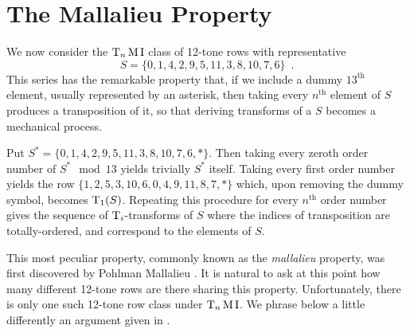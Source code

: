 \section{The Mallalieu Property}
\label{mallalieu-section}

We now consider the $\operatorname{T}_n\operatorname{M}\operatorname{I}$ class of 12-tone rows with representative
\begin{equation}
	S = \{ 0, 1, 4, 2, 9, 5, 11, 3, 8, 10, 7, 6 \} \enspace.
\end{equation}
This series has the remarkable property that, if we include a dummy $13^\text{th}$ element, usually represented by an asterisk, then taking every $n^\text{th}$ element of $S$ produces a transposition of it, so that deriving transforms of a $S$ becomes a mechanical process.

\begin{example}
	Put $S^* = \{ 0, 1, 4, 2, 9, 5, 11, 3, 8, 10, 7, 6, * \}$. Then taking every zeroth order number of $S^* \mod 13$ yields trivially $S^*$ itself. Taking every first order number yields the row $\{ 1, 2, 5, 3, 10, 6, 0, 4, 9, 11, 8, 7, * \}$ which, upon removing the dummy symbol, becomes $\operatorname{T}_1(S)$. Repeating this procedure for every $n^\text{th}$ order number gives the sequence of $\operatorname{T}_i$-transforms of $S$ where the indices of transposition are totally-ordered, and correspond to the elements of $S$.
\end{example}

This most peculiar property, commonly known as the \emph{mallalieu} property, was first discovered by Pohlman Mallalieu \cite[285]{Lewin1966}. It is natural to ask at this point how many different 12-tone rows are there sharing this property. Unfortunately, there is only one such 12-tone row class under $\operatorname{T}_n\operatorname{M}\operatorname{I}$. We phrase below a little differently an argument given in \cite[17]{Morris1976}.

